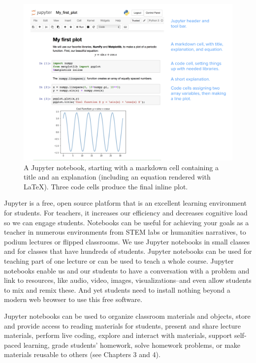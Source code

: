 \documentclass[]{book}
\begin{document}
\begin{figure}
\centering
\includegraphics{images/Fig_notebook.png}
\caption{A Jupyter notebook, starting with a markdown cell containing a
title and an explanation (including an equation rendered with LaTeX).
Three code cells produce the final inline plot.}
\end{figure}

Jupyter is a free, open source platform that is an excellent learning
environment for students. For teachers, it increases our efficiency and
decreases cognitive load so we can engage students. Notebooks can be
useful for achieving your goals as a teacher in numerous environments
from STEM labs or humanities narratives, to podium lectures or flipped
classrooms. We use Jupyter notebooks in small classes and for classes
that have hundreds of students. Jupyter notebooks can be used for
teaching part of one lecture or can be used to teach a whole course.
Jupyter notebooks enable us and our students to have a conversation with
a problem and link to resources, like audio, video, images,
visualizations--and even allow students to mix and remix these. And yet
students need to install nothing beyond a modern web browser to use this
free software.

Jupyter notebooks can be used to organize classroom materials and
objects, store and provide access to reading materials for students,
present and share lecture materials, perform live coding, explore and
interact with materials, support self-paced learning, grade students'
homework, solve homework problems, or make materials reusable to others
(see Chapters 3 and 4).
\end{document}
